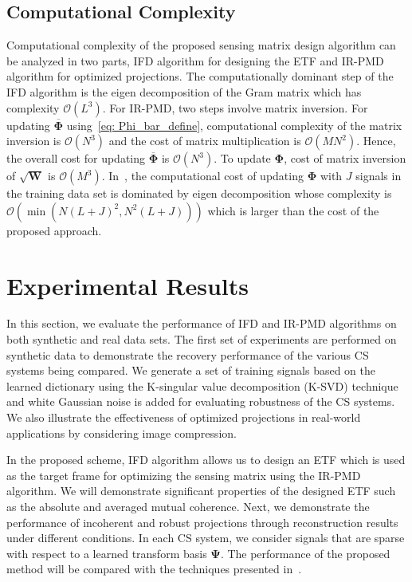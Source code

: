 \subsection{Computational Complexity}
%
Computational complexity of the proposed sensing matrix design algorithm can be analyzed in two parts, IFD algorithm for designing the ETF and IR-PMD algorithm for optimized projections. The computationally dominant step of the IFD algorithm is the eigen decomposition of the Gram matrix which has complexity $\mathcal{O}\left(L^3\right)$. For IR-PMD, two steps involve matrix inversion. For updating $\overline{\bm{\Phi}}$ using~\eqref{eq: Phi_bar_define}, computational complexity of the matrix inversion is $\mathcal{O}\left(N^{3}\right)$ and the cost of matrix multiplication is $\mathcal{O}\left(M N^{2}\right)$. Hence, the overall cost for updating $\overline{\bm{\Phi}}$ is $\mathcal{O}\left(N^{3}\right)$. To update $\bm{\Phi}$, cost of matrix inversion of $\sqrt{\bm{W}}$ is $\mathcal{O}\left(M^{3}\right)$. In~\cite{SRE_Huang}, the computational cost of updating $\bm{\Phi}$ with $J$ signals in the training data set is dominated by eigen decomposition whose complexity is $\mathcal{O}\left(\min\left(N(L+J)^{2},N^{2}(L+J)\right)\right)$ which is larger than the cost of the proposed approach.
%
\section{Experimental Results}
\label{sec: Chapter_4_Results}
%
In this section, we evaluate the performance of IFD and IR-PMD algorithms on both synthetic and real data sets. The first set of experiments are performed on synthetic data to demonstrate the recovery performance of the various CS systems being compared. We generate a set of training signals based on the learned dictionary using the K-singular value decomposition (K-SVD) technique~\cite{KSVD} and white Gaussian noise is added for evaluating robustness of the CS systems. We also illustrate the effectiveness of optimized projections in real-world applications by considering image compression. 

In the proposed scheme, IFD algorithm allows us to design an ETF which is used as the target frame for optimizing the sensing matrix using the IR-PMD algorithm. We will demonstrate significant properties of the designed ETF such as the absolute and averaged mutual coherence. Next, we demonstrate the performance of incoherent and robust projections through reconstruction results under different conditions. In each CS system, we consider signals that are sparse with respect to a learned transform basis $\bm{\Psi}$. The performance of the proposed method will be compared with the techniques presented in~\cite{Elad,Eva_frame,Sapiro,Zelnik,CHZ,SRE_Huang}.
%
